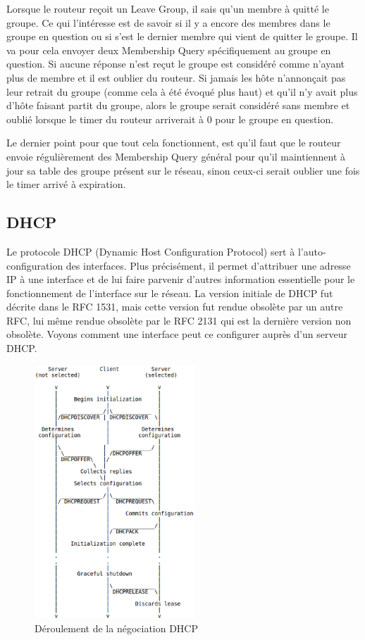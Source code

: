 Lorsque le routeur reçoit un Leave Group, il sais qu'un membre à quitté le
groupe. Ce qui l'intéresse est de savoir si il y a encore des membres dans le
groupe en question ou si s'est le dernier membre qui vient de quitter le
groupe. Il va pour cela envoyer deux Membership Query spécifiquement au groupe
en question. Si aucune réponse n'est reçut le groupe est considéré comme
n'ayant plus de membre et il est oublier du routeur.  Si jamais les hôte
n'annonçait pas leur retrait du groupe (comme cela à été évoqué plus haut) et
qu'il n'y avait plus d'hôte faisant partit du groupe, alors le groupe serait
considéré sans membre et oublié lorsque le timer du routeur arriverait à 0 pour
le groupe en question.

Le dernier point pour que tout cela fonctionnent, est qu'il faut que le routeur
envoie régulièrement des Membership Query général pour qu'il maintiennent à
jour sa table des groupe présent sur le réseau, sinon ceux-ci serait oublier
une fois le timer arrivé à expiration.



\subsection{DHCP}
Le protocole DHCP (Dynamic Host Configuration Protocol) sert à l'auto-configuration
des interfaces. Plus précisément, il  permet d'attribuer une adresse IP à une
interface et de lui faire parvenir d'autres information essentielle pour le
fonctionnement de l'interface sur le réseau. La version initiale de DHCP fut décrite
dans le RFC 1531\cite{url-RFC-DHCP1}, mais cette version fut rendue obsolète par un autre
RFC, lui même rendue obsolète par le RFC 2131\cite{url-RFC-DHCP2} qui est la dernière version non
obsolète. Voyons comment une interface peut ce configurer auprès d'un serveur DHCP.

\begin{figure}[h]
\centering
\includegraphics[width=6cm]{./pics/timeline_dhcp.eps}
\caption{Déroulement de la négociation DHCP}
\label{fig:timelinedhcp}
\end{figure}

